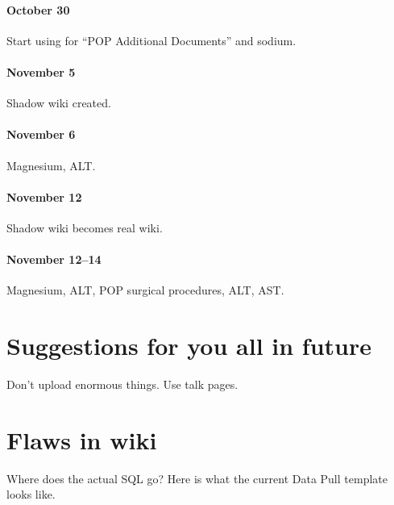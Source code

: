 \documentclass{tufte-handout}
\begin{document}
\paragraph{October 30} Start using for ``POP Additional Documents''
and sodium.

\paragraph{November 5} Shadow wiki created.

\paragraph{November 6} Magnesium, ALT.

\paragraph{November 12} Shadow wiki becomes real wiki.

\paragraph{November 12--14} Magnesium, ALT, POP surgical procedures,
ALT, AST.

\section{Suggestions for you all in future}

Don't upload enormous things. Use talk pages. 

\section{Flaws in wiki}

Where does the actual SQL go? Here is what the current Data Pull
template looks like.
\end{document}
